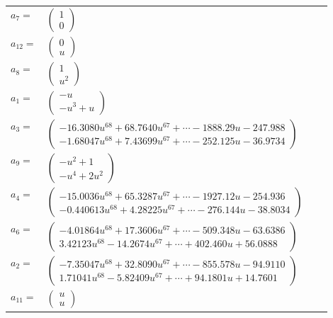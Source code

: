 \documentclass[1p]{elsarticle_modified}
\theoremstyle{definition}
\begin{document}
\begin{tabular}{m{7pt} m{180pt} m{7pt} m{180pt} }
\flushright $a_{7}=$&$\begin{pmatrix}1\\0\end{pmatrix}$ \\
\flushright $a_{12}=$&$\begin{pmatrix}0\\u\end{pmatrix}$ \\
\flushright $a_{8}=$&$\begin{pmatrix}1\\u^2\end{pmatrix}$ \\
\flushright $a_{1}=$&$\begin{pmatrix}- u\\- u^3+u\end{pmatrix}$ \\
\flushright $a_{3}=$&$\begin{pmatrix}-16.3080 u^{68}+68.7640 u^{67}+\cdots-1888.29 u-247.988\\-1.68047 u^{68}+7.43699 u^{67}+\cdots-252.125 u-36.9734\end{pmatrix}$ \\
\flushright $a_{9}=$&$\begin{pmatrix}- u^2+1\\- u^4+2 u^2\end{pmatrix}$ \\
\flushright $a_{4}=$&$\begin{pmatrix}-15.0036 u^{68}+65.3287 u^{67}+\cdots-1927.12 u-254.936\\-0.440613 u^{68}+4.28225 u^{67}+\cdots-276.144 u-38.8034\end{pmatrix}$ \\
\flushright $a_{6}=$&$\begin{pmatrix}-4.01864 u^{68}+17.3606 u^{67}+\cdots-509.348 u-63.6386\\3.42123 u^{68}-14.2674 u^{67}+\cdots+402.460 u+56.0888\end{pmatrix}$ \\
\flushright $a_{2}=$&$\begin{pmatrix}-7.35047 u^{68}+32.8090 u^{67}+\cdots-855.578 u-94.9110\\1.71041 u^{68}-5.82409 u^{67}+\cdots+94.1801 u+14.7601\end{pmatrix}$ \\
\flushright $a_{11}=$&$\begin{pmatrix}u\\u\end{pmatrix}$ \\

\end{tabular}
\end{document}
